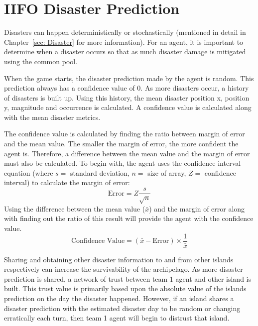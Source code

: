 \section{IIFO Disaster Prediction}
Disasters can happen deterministically or stochastically (mentioned in detail in Chapter~\ref{sec: Disaster} for more information). For an agent, it is important to determine when a disaster occurs so that as much disaster damage is mitigated using the common pool. 

When the game starts, the disaster prediction made by the agent is random. This prediction always has a confidence value of 0. As more disasters occur, a history of disasters is built up. Using this history, the mean disaster position x, position y, magnitude and occurrence is calculated. A confidence value is calculated along with the mean disaster metrics. 

The confidence value is calculated by finding the ratio between margin of error and the mean value. The smaller the margin of error, the more confident the agent is. Therefore, a difference between the mean value and the margin of error must also be calculated. To begin with, the agent uses the confidence interval equation (where $s =$ standard deviation, $n = $ size of array, $Z = $ confidence interval) to calculate the margin of error:
\begin{equation}
    \label{eq: Team1MarginOfError}
    \text{Error} = Z \dfrac{s}{\sqrt{n}} 
\end{equation}
Using the difference between the mean value ($\bar{x}$) and the margin of error along with finding out the ratio of this result will provide the agent with the confidence value.
\begin{equation}
    \text{Confidence Value} = (\bar{x} - \text{Error}) \times \dfrac{1}{\bar{x}}
\end{equation}

Sharing and obtaining other disaster information to and from other islands respectively can increase the survivability of the archipelago. As more disaster prediction is shared, a network of trust between team 1 agent and other island is built. This trust value is primarily based upon the absolute value of the islands prediction on the day the disaster happened. However, if an island shares a disaster prediction with the estimated disaster day to be random or changing erratically each turn, then team 1 agent will begin to distrust that island. 

